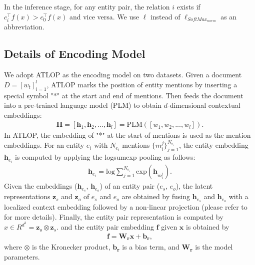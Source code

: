 \documentclass[11pt]{article}
\begin{document}
In the inference stage, for any entity pair, the relation $i$ exists if $c_{i}^{\top} f(x) > c_{0}^{\top} f(x)$ and vice versa. We use $\ell$ instead of $\ell_{SoftMax_{norm}}$ as an abbreviation.

\subsection{Details of Encoding Model}\label{A1}

We adopt ATLOP \citep{Zhou_Huang_Ma_Huang_2021} as the encoding model on two datasets. Given a document $D = [w_{t}]_{i=1}^{l}$, ATLOP marks the position of entity mentions by inserting a special symbol "*" at the start and end of mentions. Then feeds the document into a  pre-trained language model (PLM) to obtain $d$-dimensional contextual embeddings:
\begin{equation}
\begin{aligned}
\mathbf{H} = [\boldsymbol{h}_{1}, \boldsymbol{h}_{2}, ..., \boldsymbol{h}_{l}] = \mathrm{PLM}([w_{1}, w_{2}, ..., w_{l}]).
\end{aligned}
\end{equation}
In ATLOP, the embedding of "*" at the start of mentions is used as the mention embeddings. For an entity $e_{i}$ with $N_{e_{i}}$ mentions $\{m_{i}^{j}\}_{j=1}^{N_{e_{i}}}$, the entity embedding $\boldsymbol{h}_{e_{i}}$ is computed by applying the logsumexp pooling \citep{jia-etal-2019-document} as follows:
\begin{equation}
\begin{aligned}
\boldsymbol{h}_{e_{i}} = \mathrm{log}\sum_{j=1}^{N_{e_{i}}}\mathrm{exp}(\boldsymbol{h}_{m_{i}^{j}}).
\end{aligned}
\end{equation}
Given the embeddings ($\boldsymbol{h}_{e_{s}}$, $\boldsymbol{h}_{e_{o}}$) of an entity pair ($e_{s}$, $e_{o}$), the latent representations $\boldsymbol{z}_{s}$ and $\boldsymbol{z}_{o}$ of $e_{s}$ and $e_{o}$ are obtained by fusing $\boldsymbol{h}_{e_{s}}$ and $\boldsymbol{h}_{e_{o}}$ with a localized context embedding followed by a non-linear projection (please refer to \citep{Zhou_Huang_Ma_Huang_2021} for more details). Finally, the entity pair representation is computed by $x \in R^{d^{2}}= \boldsymbol{z}_{o} \otimes \boldsymbol{z}_{s}$. and the entity pair embedding $\boldsymbol{f}$ given $\boldsymbol{x}$ is obtained by
\begin{equation}
\begin{aligned}
\boldsymbol{f} = \boldsymbol{W_{r}}\boldsymbol{x} + \boldsymbol{b_{r}},
\end{aligned}
\end{equation}
where $\otimes$ is the Kronecker product, $\boldsymbol{b_{r}}$ is a bias term, and $\boldsymbol{W_{r}}$ is the model parameters.
\end{document}
